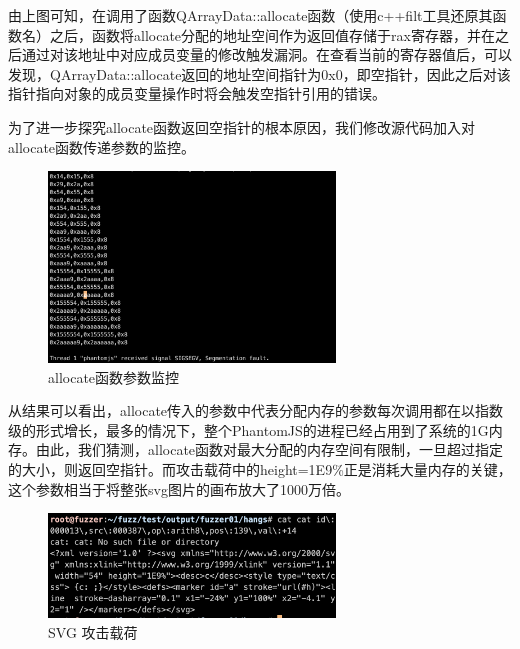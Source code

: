 \documentclass[doctor,privacy,twoside]{buaa_mac}
\begin{document}
 由上图可知，在调用了函数QArrayData::allocate函数（使用c++filt工具还原其函数名）之后，函数将allocate分配的地址空间作为返回值存储于rax寄存器，并在之后通过对该地址中对应成员变量的修改触发漏洞。在查看当前的寄存器值后，可以发现，QArrayData::allocate返回的地址空间指针为0x0，即空指针，因此之后对该指针指向对象的成员变量操作时将会触发空指针引用的错误。
 
 为了进一步探究allocate函数返回空指针的根本原因，我们修改源代码加入对allocate函数传递参数的监控。
 
  \centerline{}
\begin{figure}[!h]
  \centering
  \includegraphics[width=0.68\textwidth]{images/gdb_parameter.png}
  \caption{allocate函数参数监控}
  \label{fig:logo}
\end{figure}
\centerline{}

  
从结果可以看出，allocate传入的参数中代表分配内存的参数每次调用都在以指数级的形式增长，最多的情况下，整个PhantomJS的进程已经占用到了系统的1G内存。由此，我们猜测，allocate函数对最大分配的内存空间有限制，一旦超过指定的大小，则返回空指针。而攻击载荷中的height=1E9\%正是消耗大量内存的关键，这个参数相当于将整张svg图片的画布放大了1000万倍。

  \centerline{}
\begin{figure}[!h]
  \centering
  \includegraphics[width=0.68\textwidth]{images/svg_payload.png}
  \caption{SVG 攻击载荷}
  \label{fig:logo}
\end{figure}
\centerline{}




\achievement
\end{document}
